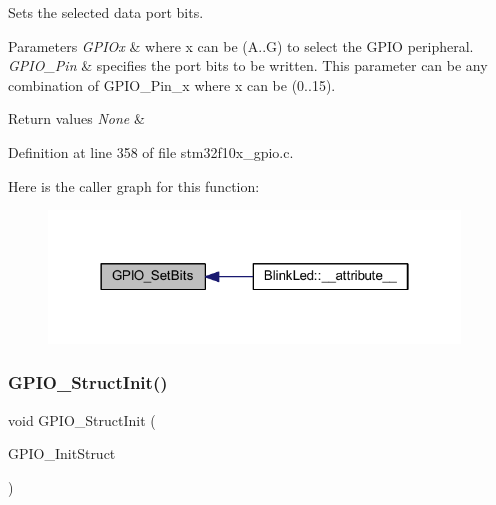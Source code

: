 Sets the selected data port bits. 


\begin{DoxyParams}{Parameters}
{\em G\+P\+I\+Ox} & where x can be (A..G) to select the G\+P\+IO peripheral. \\
\hline
{\em G\+P\+I\+O\+\_\+\+Pin} & specifies the port bits to be written. This parameter can be any combination of G\+P\+I\+O\+\_\+\+Pin\+\_\+x where x can be (0..15). \\
\hline
\end{DoxyParams}

\begin{DoxyRetVals}{Return values}
{\em None} & \\
\hline
\end{DoxyRetVals}


Definition at line 358 of file stm32f10x\+\_\+gpio.\+c.

Here is the caller graph for this function\+:
\nopagebreak
\begin{figure}[H]
\begin{center}
\leavevmode
\includegraphics[width=310pt]{group___g_p_i_o___private___functions_ga9e1352eed7c6620e18af2d86f6b6ff8e_icgraph}
\end{center}
\end{figure}
\mbox{\label{group___g_p_i_o___private___functions_gab28de41278e7f8c63d0851e2733b10df}} 
\subsubsection{\texorpdfstring{G\+P\+I\+O\+\_\+\+Struct\+Init()}{GPIO\_StructInit()}}
{\footnotesize\ttfamily void G\+P\+I\+O\+\_\+\+Struct\+Init (\begin{DoxyParamCaption}\item[{\hyperlink{struct_g_p_i_o___init_type_def}{G\+P\+I\+O\+\_\+\+Init\+Type\+Def} $\ast$}]{G\+P\+I\+O\+\_\+\+Init\+Struct }\end{DoxyParamCaption})}




